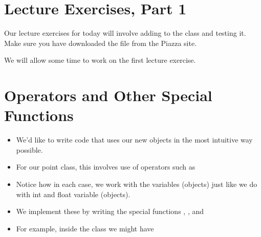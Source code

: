 \documentclass[letterpaper,10pt,english]{sphinxmanual}
\begin{document}
\section{Lecture Exercises, Part 1}
\label{\detokenize{lecture_notes/lec18_classes1:lecture-exercises-part-1}}
Our lecture exercises for today will involve adding to the 
class and testing it.  Make sure you have downloaded the
 file from the Piazza site.

We will allow some time to work on the first lecture exercise.


\section{Operators and Other Special Functions}
\label{\detokenize{lecture_notes/lec18_classes1:operators-and-other-special-functions}}\begin{itemize}
\item {} 
We’d like to write code that uses our new objects in the most
intuitive way possible.

\item {} 
For our point class, this involves use of operators such as

%
\begin{sphinxVerbatim}[commandchars=\\\{\}]
  
  
  
  
  
\end{sphinxVerbatim}

\item {} 
Notice how in each case, we work with the  variables
(objects) just like we do with int and float variable (objects).

\item {} 
We implement these by writing the special functions ,
, and 

\item {} 
For example, inside the  class we might have


\end{itemize}
\end{document}
